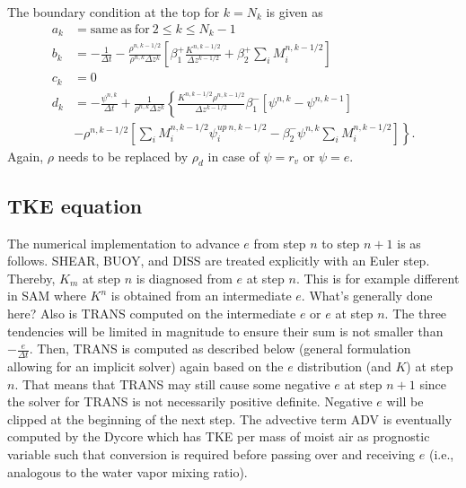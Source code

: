 \documentclass[dvipdfmx,a4paper,10pt]{article}
\begin{document}
The boundary condition at the top for $k=N_k$ is given as
\begin{align*}
  a_k &= \mathrm{same~as~for~}2\leq k \leq N_k-1  \\
    b_k &= -\frac{1}{\Delta t} - \frac{\rho^{n,k-1/2}}{\rho^{n,k}\Delta z^k} \left[\beta_1^+\frac{K^{n,k-1/2}}{\Delta z ^{k-1/2}}+\beta_2^+\sum_iM_i^{n,k-1/2} \right] \\
      c_k &= 0 \\
      d_k &= -\frac{\psi^{n,k}}{\Delta t} + \frac{1}{\rho^{n,k}\Delta z^k} \left\{ \frac{K^{n,k-1/2}\rho^{n,k-1/2}}{\Delta z^{k-1/2}}\beta_1^{-}\left[\psi^{n,k} - \psi^{n,k-1}\right]\right.   \\   
          & \left.-\rho^{n,k-1/2}\left[\sum_iM_i^{n,k-1/2}\psi_i^{up~n,k-1/2} -\beta_2^{-}\psi^{n,k}\sum_iM_i^{n,k-1/2} \right]\right\}.    
\end{align*}
Again, $\rho$ needs to be replaced by $\rho_d$ in case of $\psi=r_v$ or $\psi=e$. 

\subsection{TKE equation}

The numerical implementation to advance $e$ from step $n$ to step $n+1$ is as follows. SHEAR, BUOY, and DISS are treated explicitly with an Euler step. Thereby, $K_m$ at step $n$ is diagnosed from $e$ at step $n$. {\color{blue} This is for example different in SAM where $K^n$ is obtained from an intermediate $e$. What's generally done here? Also is TRANS computed on the intermediate $e$ or $e$ at step $n$.} The three tendencies will be limited in magnitude to ensure their sum is not smaller than $-\frac{e}{\Delta t}$. Then, TRANS is computed as described below (general formulation allowing for an implicit solver) again based on the $e$ distribution (and $K$) at step $n$. That means that TRANS may still cause some negative $e$ at step $n+1$ since the solver for TRANS is not necessarily positive definite. Negative $e$ will be clipped at the beginning of the next step.  The advective term ADV is eventually computed by the Dycore which has TKE per mass of moist air as prognostic variable such that conversion is required before passing over and receiving $e$ (i.e., analogous to the water vapor mixing ratio). 
\end{document}
